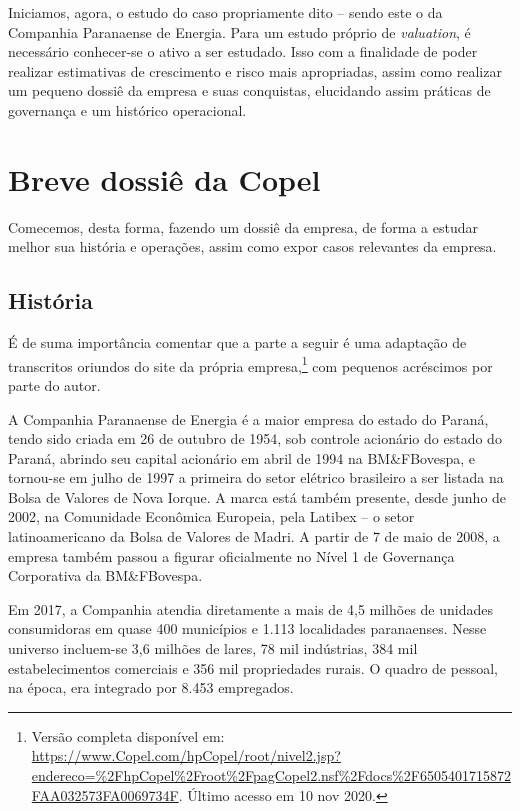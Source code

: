 \documentclass[grad,numbers]{coppe}
\begin{document}
  Iniciamos, agora, o estudo do caso propriamente dito -- sendo este o da Companhia Paranaense de Energia. Para um estudo próprio de \emph{valuation}, é necessário conhecer-se o ativo a ser estudado. Isso com a finalidade de poder realizar estimativas de crescimento e risco mais apropriadas, assim como realizar um pequeno dossiê da empresa e suas conquistas, elucidando assim práticas de governança e um histórico operacional.

  \hypertarget{breve-dossiuxea-da-copel}{%
  \section{Breve dossiê da Copel}\label{breve-dossiuxea-da-copel}}

  Comecemos, desta forma, fazendo um dossiê da empresa, de forma a estudar melhor sua história e operações, assim como expor casos relevantes da empresa.

  \hypertarget{histuxf3ria}{%
  \subsection{História}\label{histuxf3ria}}

  É de suma importância comentar que a parte a seguir é uma adaptação de transcritos oriundos do site da própria empresa,\footnote{Versão completa disponível em: \url{https://www.Copel.com/hpCopel/root/nivel2.jsp?endereco=\%2FhpCopel\%2Froot\%2FpagCopel2.nsf\%2Fdocs\%2F6505401715872FAA032573FA0069734F}. Último acesso em 10 nov 2020.} com pequenos acréscimos por parte do autor.

  A Companhia Paranaense de Energia é a maior empresa do estado do Paraná, tendo sido criada em 26 de outubro de 1954, sob controle acionário do estado do Paraná, abrindo seu capital acionário em abril de 1994 na BM\&FBovespa, e tornou-se em julho de 1997 a primeira do setor elétrico brasileiro a ser listada na Bolsa de Valores de Nova Iorque. A marca está também presente, desde junho de 2002, na Comunidade Econômica Europeia, pela Latibex -- o setor latinoamericano da Bolsa de Valores de Madri. A partir de 7 de maio de 2008, a empresa também passou a figurar oficialmente no Nível 1 de Governança Corporativa da BM\&FBovespa.

  Em 2017, a Companhia atendia diretamente a mais de 4,5 milhões de unidades consumidoras em quase 400 municípios e 1.113 localidades paranaenses. Nesse universo incluem-se 3,6 milhões de lares, 78 mil indústrias, 384 mil estabelecimentos comerciais e 356 mil propriedades rurais. O quadro de pessoal, na época, era integrado por 8.453 empregados.
\end{document}
